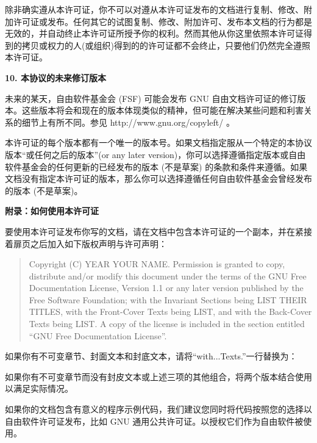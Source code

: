 除非确实遵从本许可证，你不可以对遵从本许可证发布的文档进行复制、修改、附加许可证或发布。任何其它的试图复制、修改、附加许可、发布本文档的行为都是无效的，并自动终止本许可证所授予你的权利。然而其他从你这里依照本许可证得到的拷贝或权力的人(或组织)得到的的许可证都不会终止，只要他们仍然完全遵照本许可证。

\begin{center}
{\Large\bf 10. 本协议的未来修订版本\par}
\end{center}


未来的某天，自由软件基金会 (FSF) 可能会发布 GNU 自由文档许可证的修订版本。这些版本将会和现在的版本体现类似的精神，但可能在解决某些问题和利害关系的细节上有所不同。参见 http://www.gnu.org/copyleft/ 。

本许可证的每个版本都有一个唯一的版本号。如果文档指定服从一个特定的本协议版本``或任何之后的版本''(or any later version)，你可以选择遵循指定版本或自由软件基金会的任何更新的已经发布的版本 (不是草案) 的条款和条件来遵循。如果文档没有指定本许可证的版本，那么你可以选择遵循任何自由软件基金会曾经发布的版本 (不是草案)。

\begin{center}
{\Large\bf 附录：如何使用本许可证\par}
\end{center}


要使用本许可证发布你写的文档，请在文档中包含本许可证的一个副本，并在紧接着扉页之后加入如下版权声明与许可声明：

\begin{quote}

Copyright (C) YEAR YOUR NAME.
Permission is granted to copy, distribute and/or modify this document under the terms of the GNU Free Documentation License, Version 1.1 or any later version published by the Free Software Foundation; with the Invariant Sections being LIST THEIR TITLES, with the Front-Cover Texts being LIST, and with the Back-Cover Texts being LIST. A copy of the license is included in the section entitled ``GNU Free Documentation License''.

\end{quote}

如果你有不可变章节、封面文本和封底文本，请将``with...Texts.''一行替换为：

如果你有不可变章节而没有封皮文本或上述三项的其他组合，将两个版本结合使用以满足实际情况。

如果你的文档包含有意义的程序示例代码，我们建议您同时将代码按照您的选择以自由软件许可证发布，比如 GNU 通用公共许可证。以授权它们作为自由软件被使用。
\fi
